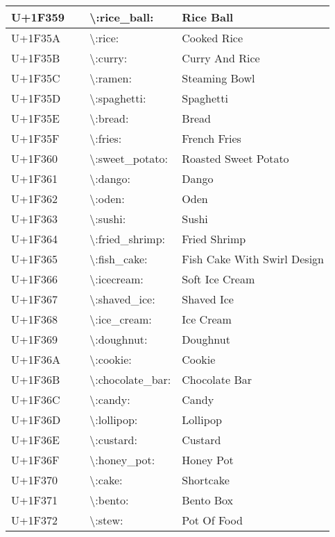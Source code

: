 \begin{table}[h]
\begin{tabulary}{\linewidth}{|L|L|L|L|}
\hline
U+1F359 & 🍙 & {\textbackslash}:rice\_ball: & Rice Ball \\
\hline
U+1F35A & 🍚 & {\textbackslash}:rice: & Cooked Rice \\
\hline
U+1F35B & 🍛 & {\textbackslash}:curry: & Curry And Rice \\
\hline
U+1F35C & 🍜 & {\textbackslash}:ramen: & Steaming Bowl \\
\hline
U+1F35D & 🍝 & {\textbackslash}:spaghetti: & Spaghetti \\
\hline
U+1F35E & 🍞 & {\textbackslash}:bread: & Bread \\
\hline
U+1F35F & 🍟 & {\textbackslash}:fries: & French Fries \\
\hline
U+1F360 & 🍠 & {\textbackslash}:sweet\_potato: & Roasted Sweet Potato \\
\hline
U+1F361 & 🍡 & {\textbackslash}:dango: & Dango \\
\hline
U+1F362 & 🍢 & {\textbackslash}:oden: & Oden \\
\hline
U+1F363 & 🍣 & {\textbackslash}:sushi: & Sushi \\
\hline
U+1F364 & 🍤 & {\textbackslash}:fried\_shrimp: & Fried Shrimp \\
\hline
U+1F365 & 🍥 & {\textbackslash}:fish\_cake: & Fish Cake With Swirl Design \\
\hline
U+1F366 & 🍦 & {\textbackslash}:icecream: & Soft Ice Cream \\
\hline
U+1F367 & 🍧 & {\textbackslash}:shaved\_ice: & Shaved Ice \\
\hline
U+1F368 & 🍨 & {\textbackslash}:ice\_cream: & Ice Cream \\
\hline
U+1F369 & 🍩 & {\textbackslash}:doughnut: & Doughnut \\
\hline
U+1F36A & 🍪 & {\textbackslash}:cookie: & Cookie \\
\hline
U+1F36B & 🍫 & {\textbackslash}:chocolate\_bar: & Chocolate Bar \\
\hline
U+1F36C & 🍬 & {\textbackslash}:candy: & Candy \\
\hline
U+1F36D & 🍭 & {\textbackslash}:lollipop: & Lollipop \\
\hline
U+1F36E & 🍮 & {\textbackslash}:custard: & Custard \\
\hline
U+1F36F & 🍯 & {\textbackslash}:honey\_pot: & Honey Pot \\
\hline
U+1F370 & 🍰 & {\textbackslash}:cake: & Shortcake \\
\hline
U+1F371 & 🍱 & {\textbackslash}:bento: & Bento Box \\
\hline
U+1F372 & 🍲 & {\textbackslash}:stew: & Pot Of Food \\

\end{tabulary}
\end{table}
